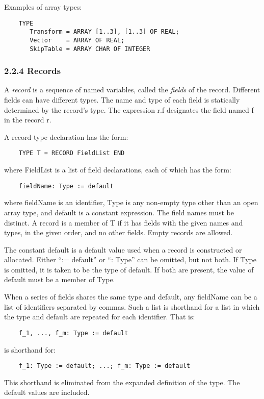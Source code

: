 \documentclass[10pt]{article}
\begin{document}
  Examples of array types: 
\begin{verbatim}
    TYPE
       Transform = ARRAY [1..3], [1..3] OF REAL;
       Vector    = ARRAY OF REAL;
       SkipTable = ARRAY CHAR OF INTEGER
\end{verbatim}



 
\subsubsection*{2.2.4 Records}


  A \emph{record}
 is a sequence of named variables, called the \emph{fields}
 of the record. Different fields can have different types. The name and type of each field is statically determined by the record's type. The expression r.f designates the field named f in the record r. 


  A record type declaration has the form: 
\begin{verbatim}
    TYPE T = RECORD FieldList END
\end{verbatim}
 where FieldList is a list of field declarations, each of which has the form: 
\begin{verbatim}
    fieldName: Type := default
\end{verbatim}
 where fieldName is an identifier, Type is any non-empty type other than an open array type, and default is a constant expression. The field names must be distinct. A record is a member of T if it has fields with the given names and types, in the given order, and no other fields. Empty records are allowed. 


 The constant default is a default value used when a record is constructed or allocated. Either ``:= default'' or ``: Type'' can be omitted, but not both. If Type is omitted, it is taken to be the type of default. If both are present, the value of default must be a member of Type. 


  When a series of fields shares the same type and default, any fieldName can be a list of identifiers separated by commas. Such a list is shorthand for a list in which the type and default are repeated for each identifier. That is: 
\begin{verbatim}
    f_1, ..., f_m: Type := default
\end{verbatim}
 is shorthand for: 
\begin{verbatim}
    f_1: Type := default; ...; f_m: Type := default
\end{verbatim}
 This shorthand is eliminated from the expanded definition of the type. The default values are included. 
\end{document}
